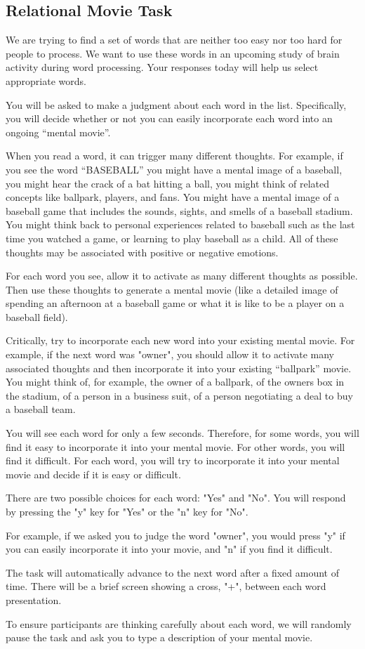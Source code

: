 \documentclass[man,natbib,floatsintext]{apa6} %
\begin{document}
\subsection{Relational Movie Task}
\begin{displayquote}
We are trying to find a set of words that are neither too easy nor too hard for people to process. We want to use these words in an upcoming study of brain activity during word processing. Your responses today will help us select appropriate words.

You will be asked to make a judgment about each word in the list. Specifically, you will decide whether or not you can easily incorporate each word into an ongoing ``mental movie''.

When you read a word, it can trigger many different thoughts. For example, if you see the word ``BASEBALL'' you might have a mental image of a baseball, you might hear the crack of a bat hitting a ball, you might think of related concepts like ballpark, players, and fans. You might have a mental image of a baseball game that includes the sounds, sights, and smells of a baseball stadium. You might think back to personal experiences related to baseball such as the last time you watched a game, or learning to play baseball as a child. All of these thoughts may be associated with positive or negative emotions.

For each word you see, allow it to activate as many different thoughts as possible. Then use these thoughts to generate a mental movie (like a detailed image of spending an afternoon at a baseball game or what it is like to be a player on a baseball field).

Critically, try to incorporate each new word into your existing mental movie. For example, if the next word was "owner", you should allow it to activate many associated thoughts and then incorporate it into your existing ``ballpark'' movie. You might think of, for example, the owner of a ballpark, of the owners box in the stadium, of a person in a business suit, of a person negotiating a deal to buy a baseball team.

You will see each word for only a few seconds. Therefore, for some words, you will find it easy to incorporate it into your mental movie. For other words, you will find it difficult. For each word, you will try to incorporate it into your mental movie and decide if it is easy or difficult.

There are two possible choices for each word: "Yes" and "No". You will respond by pressing the "y" key for "Yes" or the "n" key for "No".

For example, if we asked you to judge the word "owner", you would press "y" if you can easily incorporate it into your movie, and "n" if you find it difficult.

The task will automatically advance to the next word after a fixed amount of time. There will be a brief screen showing a cross, "+", between each word presentation.

To ensure participants are thinking carefully about each word, we will randomly pause the task and ask you to type a description of your mental movie.
\end{displayquote}
\end{document}
